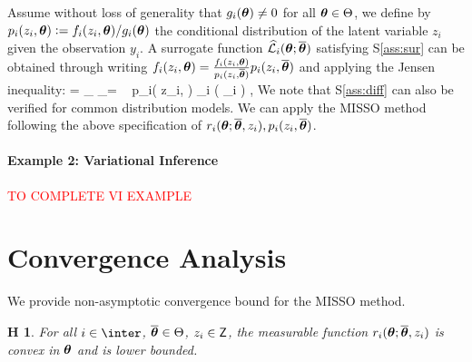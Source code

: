 \documentclass[11pt]{article}
\newtheorem{assumption}{H\!\!}
\theoremstyle{t}
\begin{document}
Assume without loss of generality  that $g_i(\param) \neq 0$ for all $\param \in \Param$, we define by $p_i(z_i, \param) \eqdef f_i(z_i,\param)/g_i(\param)$ the conditional distribution of the latent variable $z_i$ given the observation $y_i$.
A surrogate function $\sur{i}{\param}{\op}$ satisfying S\ref{ass:sur} can be obtained through writing
$f_i(z_i,\param) = \frac{f_i(z_i,\param)}{p_i(z_i, \op)} p_i(z_i,\op)$ and applying the Jensen inequality:
\beq\label{pairmcem}
 = \int_{\Zset} _{=  } \!~ p_i( z_i, \op ) \mu_i ( \dz_i ) \eqsp,
\eeq
We note that S\ref{ass:diff} can also be verified for common distribution models.
We can apply the MISSO method following the above specification of $\rsur{i}{\param}{\op}{z_i}, p_i( z_i, \op )$.


\paragraph{Example 2: Variational Inference} 
\textcolor{red}{TO COMPLETE VI EXAMPLE}

\section{Convergence Analysis}\label{sec:analysis}
We provide non-asymptotic convergence bound for the MISSO method.
\begin{assumption} \label{ass:lips}
For all $i \in \inter$, $\op \in \Param$, $z_i \in \Zset$, the measurable function $\rsur{i}{\param}{\op}{z_i}$ is convex in $\param$ and is lower bounded.
\end{assumption}
\end{document}
